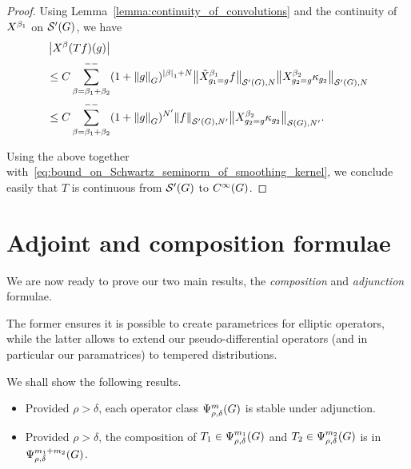 \begin{proof}
    Using Lemma~\ref{lemma:continuity_of_convolutions} and the continuity of $\LeftDifferentialOperator {\beta_1}$ on ${\mathcal{S}' (G)}$,
    we have
    \begin{align*}
        &\abs {\LeftDifferentialOperator \beta (T f)(g)}\\
        &\leq
        C
        \lcsum{\beta = \beta_1 + \beta_2}
        (1 + \norm [\Group] g)^{\abs \beta_1 + N}
        \seminorm [\TemperedDistributions \Group] N {\RightDifferentialOperator [g_1 = g] {\beta_1} f}
        \seminorm [\TemperedDistributions \Group] N {\LeftDifferentialOperator [g_2 = g] {\beta_2} \kappa_{g_2}}\\
        &\leq
        C
        \lcsum{\beta = \beta_1 + \beta_2}
        (1 + \norm [\Group] g)^{N'}
        \seminorm [\TemperedDistributions \Group] {N'} f
        \seminorm [\Schwartz \Group] {N'} {\LeftDifferentialOperator [g_2 = g] {\beta_2} \kappa_{g_2}}.
    \end{align*}

    Using the above together with~\eqref{eq:bound_on_Schwartz_seminorm_of_smoothing_kernel},
    we conclude easily that $T$ is continuous from ${\mathcal{S}' (G)}$ to ${C^\infty(G)}$.
\end{proof}

\section{Adjoint and composition formulae}
\label{section:adjoint_and_composition_formulae}

We are now ready to prove our two main results,
the \emph{composition} and \emph{adjunction} formulae.

The former ensures it is possible to create parametrices for elliptic operators,
while the latter allows to extend our pseudo-differential operators (and in particular our paramatrices) to tempered distributions.

We shall show the following results.

\begin{itemize}
    \item Provided $\rho > \delta$,
        each operator class $\Psi^{m}_{\rho, \delta}(G)$ is stable under adjunction.
    \item Provided $\rho > \delta$,
        the composition of $T_1 \in \Psi^{m_1}_{\rho, \delta}(G)$ and $T_2 \in \Psi^{m_2}_{\rho, \delta}(G)$ is in $\Psi^{m_1 + m_2}_{\rho, \delta}(G)$.
\end{itemize}

